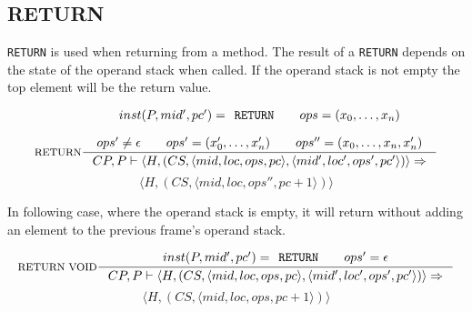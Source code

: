 \subsection{RETURN}
\texttt{RETURN} is used when returning from a method.
The result of a \texttt{RETURN} depends on the state of the operand stack when called.
If the operand stack is not empty the top element will be the return value.

$$\inference[RETURN]{
inst(P,mid',pc') = \texttt{RETURN} \semsp
ops = (x_0, \ldots, x_n) \semnl \\
ops' \neq \epsilon \semsp
ops' = (x'_0, \ldots, x'_n) \semsp
ops'' = (x_0, \ldots, x_n, x'_n)} 
{CP, P \vdash \langle H, (CS, \langle mid, loc, ops, pc \rangle, \langle mid', loc', ops', pc' \rangle)\rangle \Rightarrow}$$
$$ \langle H, (CS, \langle mid, loc, ops'', pc + 1 \rangle)\rangle$$

In following case, where the operand stack is empty, it will return without adding an element to the previous frame's operand stack.

$$\inference[RETURN VOID]{
inst(P,mid',pc') = \texttt{RETURN} \semsp
ops' = \epsilon }
{CP, P \vdash \langle H, (CS, \langle mid, loc, ops, pc \rangle, \langle mid', loc', ops', pc' \rangle)\rangle \Rightarrow}$$
$$ \langle H, (CS, \langle mid, loc, ops, pc + 1 \rangle)\rangle$$
